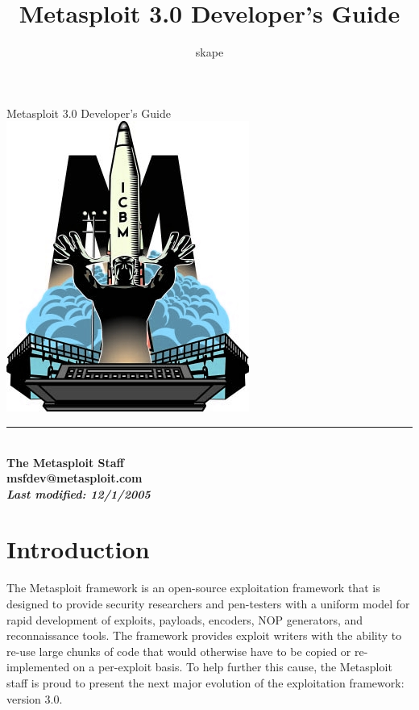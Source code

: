 \documentclass{report}
\begin{document}
\title{Metasploit 3.0 Developer's Guide}
\author{skape}

\begin{titlepage}
    \begin{center}
        \huge{{Metasploit 3.0 Developer's Guide}} \\[10mm]
        \includegraphics{logo} \\[15mm]
        \rule{10cm}{1pt} \\[8mm]
        \small\bf{The Metasploit Staff} \\
        \small\bf{msfdev@metasploit.com} \\[4mm]
        \textit{Last modified: \small{12/1/2005}}
    \end{center}
\end{titlepage}

\tableofcontents

\setlength{\parindent}{0pt} \setlength{\parskip}{8pt}

\chapter{Introduction}

\par
The Metasploit framework is an open-source exploitation framework
that is designed to provide security researchers and pen-testers
with a uniform model for rapid development of exploits, payloads,
encoders, NOP generators, and reconnaissance tools.  The framework
provides exploit writers with the ability to re-use large chunks of
code that would otherwise have to be copied or re-implemented on a
per-exploit basis.  To help further this cause, the Metasploit staff
is proud to present the next major evolution of the exploitation
framework: version 3.0.
\end{document}

